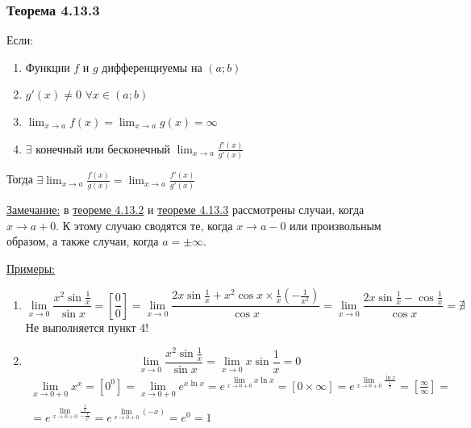\documentclass[12pt]{article}
\begin{document}
    \subsubsection*{Теорема 4.13.3}\label{th:4.13.3}
    \noindent Если: \begin{enumerate}
        \item Функции $f$ и $g$ дифференциуемы на $(a;b)$
        \item $g'(x) \ne 0$ $\forall x \in (a;b)$
        \item $\lim_{x\to a} f(x) = \lim_{x\to a}g(x) = \infty$
        \item $\exists$ конечный или бесконечный $\lim_{x\to a} \frac{f'(x)}{g'(x)}$
    \end{enumerate}
    Тогда $\exists \lim_{x\to a}\frac{f(x)}{g(x)} = \lim_{x\to a}\frac{f'(x)}{g'(x)}$\par\noindent
    \underline{Замечание:} в \hyperref[th:4.13.2]{теореме 4.13.2} и \hyperref[th:4.13.3]{теореме 4.13.3} рассмотрены случаи, когда $x \to a + 0$. К этому случаю сводятся те, когда $x \to a - 0$ или произвольным образом, а также случаи, когда $a = \pm \infty$.\par\noindent
    \underline{Примеры:} \begin{enumerate}
        \item \[ \lim_{x\to 0} \frac{x^2 \sin \frac{1}{x}}{\sin x} = \left[\frac{0}{0}\right] = \lim_{x\to 0}\frac{2x \sin \frac{1}{x} + x^2 \cos x \times \frac{1}{x} (-\frac{1}{x^2})}{\cos x} = \lim_{x\to 0} \frac{2x \sin \frac{1}{x} - \cos \frac{1}{x}}{\cos x} = \nexists \]
        Не выполняется пункт 4!
        \item \[ \lim_{x\to 0}\frac{x^2 \sin \frac{1}{x}}{\sin x} = \lim_{x\to 0}x \sin \frac{1}{x} = 0 \]
        \begin{gather*}
            \lim_{x\to 0+0}x^x = \left[0^0\right] = \lim_{x\to 0 + 0}e^{x\ln x} = e^{\lim_{x\to 0 + 0}x \ln x} = \left[ 0 \times \infty \right] = e^{\lim_{x\to 0 + 0}\frac{\ln x}{\frac{1}{x}}} = \left[ \frac{\infty}{\infty} \right] =\\= e^{\lim_{x\to 0 + 0}\frac{\frac{1}{x}}{-\frac{1}{x^2}}} = e^{\lim_{x\to 0 + 0}(-x)} = e^0 = 1
        \end{gather*}
    \end{enumerate} 
\end{document}
